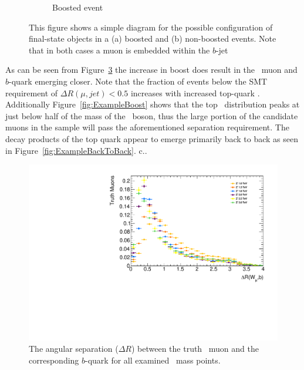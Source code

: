 \begin{figure}[t]
\begin{subfigure}[b]{0.45\textwidth}
    \caption{Boosted event} \label{fig:BoostedDiagram}
  \end{subfigure}
  \caption{This figure shows a simple diagram for the possible configuration of final-state objects in a (a) boosted and (b) non-boosted events. Note that in both cases a muon is embedded within the $b$-jet} \label{fig:SimpleAngularDiagrams}

\end{figure}

As can be seen from Figure~\ref{fig:ExampleCollimation} the increase in boost does result in the \W\ muon and $b$-quark emerging closer. Note that the fraction of events below the SMT requirement of $\Delta R(\mu,jet)<0.5$ increases with increased top-quark \pt. Additionally Figure~\ref{fig:ExampleBoost} shows that the top \pt\ distribution peaks at just below half of the mass of the \Zprime\ boson, thus the large portion of the candidate muons in the sample will pass the aforementioned separation requirement. The decay products of the top quark appear to emerge primarily back to back as seen in Figure~\ref{fig:ExampleBackToBack}.
c..
\begin{figure}[t]
\includegraphics[width=\textwidth]{PartBoosted/Plots/h_trmu_b_dr.pdf}
\caption{The angular separation ($\Delta R$) between the truth \W\ muon and the corresponding $b$-quark for all examined \Zprime\ mass points.} \label{fig:ExampleCollimation}
\end{figure}

